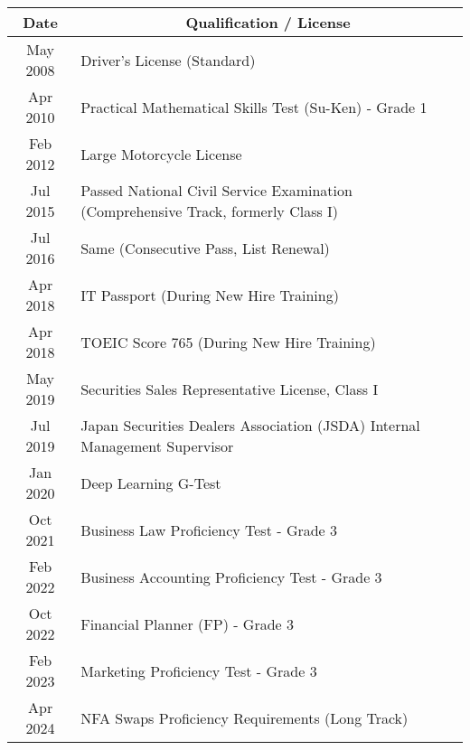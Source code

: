 \documentclass[uplatex,a4j,10.5pt,dvipdfmx]{jsarticle}
\begin{document}
\begin{longtable}{|c|l|}
	\hline
	\multicolumn{1}{|c|}{\textbf{Date}} & \multicolumn{1}{c|}{\textbf{Qualification / License}}                             \\
	\hline
	\endhead
	\hline
	\endlastfoot

	May 2008                            & Driver's License (Standard)                                                       \\
	\hline
	Apr 2010                            & Practical Mathematical Skills Test (Su-Ken) - Grade 1                             \\
	\hline
	Feb 2012                            & Large Motorcycle License                                                          \\
	\hline
	Jul 2015                            & Passed National Civil Service Examination (Comprehensive Track, formerly Class I) \\
	\hline
	Jul 2016                            & Same (Consecutive Pass, List Renewal)                                             \\
	\hline
	Apr 2018                            & IT Passport (During New Hire Training)                                            \\
	\hline
	Apr 2018                            & TOEIC Score 765 (During New Hire Training)                                        \\
	\hline
	May 2019                            & Securities Sales Representative License, Class I                                  \\
	\hline
	Jul 2019                            & Japan Securities Dealers Association (JSDA) Internal Management Supervisor        \\
	\hline
	Jan 2020                            & Deep Learning G-Test                                                              \\
	\hline
	Oct 2021                            & Business Law Proficiency Test - Grade 3                                           \\
	\hline
	Feb 2022                            & Business Accounting Proficiency Test - Grade 3                                    \\
	\hline
	Oct 2022                            & Financial Planner (FP) - Grade 3                                                  \\
	\hline
	Feb 2023                            & Marketing Proficiency Test - Grade 3                                              \\
	\hline
	Apr 2024                            & NFA Swaps Proficiency Requirements (Long Track)                                   \\
	\hline
\end{longtable}
\end{document}
